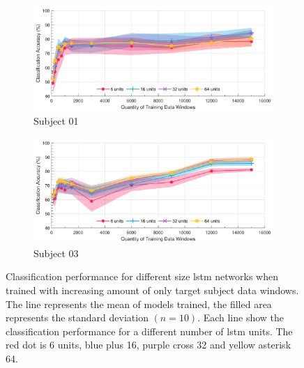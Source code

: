 \begin{figure}[htbp]
    \centering
    \begin{subfigure}[b]{\textwidth}
        \centering
        \includegraphics[width=\textwidth]{content/5-Personalisation/Bespoke_Target/ch5_bespoke_target_model_subject_1.pdf}
        \caption{Subject 01}
        \label{fig:ch5_6_unit_bespoke_model}
    \end{subfigure}
    \begin{subfigure}[b]{\textwidth}
        \centering
        \includegraphics[width=\textwidth]{content/5-Personalisation/Bespoke_Target/ch5_bespoke_target_model_subject_3.pdf}
        \caption{Subject 03}
        \label{fig:ch5_16_unit_bespoke_model}
    \end{subfigure}
    \caption[Classification performance for different size  networks when trained with increasing amount of only target subject data windows.]{Classification performance for different size \acrshort{lstm} networks when trained with increasing amount of only target subject data windows. The line represents the mean of models trained, the filled area represents the standard deviation $(n=10)$. Each line show the classification performance for a different number of \acrshort{lstm} units. The red dot is 6 units, blue plus 16, purple cross 32 and yellow asterisk 64.}
    \label{fig:ch5_bespoke_mode_classification}
\end{figure}

